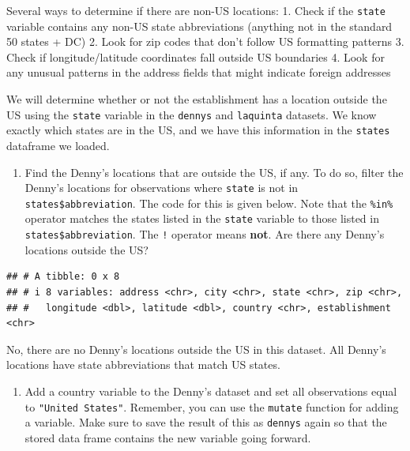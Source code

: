 \documentclass[
]{article}
\newenvironment{Shaded}{\begin{snugshade}}{\end{snugshade}}
\newcommand{\FunctionTok}[1]{\textcolor[rgb]{0.13,0.29,0.53}{\textbf{#1}}}
\newcommand{\NormalTok}[1]{#1}
\newcommand{\SpecialCharTok}[1]{\textcolor[rgb]{0.81,0.36,0.00}{\textbf{#1}}}
\providecommand{\tightlist}{%
  \setlength{\itemsep}{0pt}\setlength{\parskip}{0pt}}
\begin{document}
Several ways to determine if there are non-US locations: 1. Check if the
\texttt{state} variable contains any non-US state abbreviations
(anything not in the standard 50 states + DC) 2. Look for zip codes that
don't follow US formatting patterns 3. Check if longitude/latitude
coordinates fall outside US boundaries 4. Look for any unusual patterns
in the address fields that might indicate foreign addresses

We will determine whether or not the establishment has a location
outside the US using the \texttt{state} variable in the \texttt{dennys}
and \texttt{laquinta} datasets. We know exactly which states are in the
US, and we have this information in the \texttt{states} dataframe we
loaded.

\begin{enumerate}
\def\labelenumi{\arabic{enumi}.}
\setcounter{enumi}{4}
\tightlist
\item
  Find the Denny's locations that are outside the US, if any. To do so,
  filter the Denny's locations for observations where \texttt{state} is
  not in \texttt{states\$abbreviation}. The code for this is given
  below. Note that the \texttt{\%in\%} operator matches the states
  listed in the \texttt{state} variable to those listed in
  \texttt{states\$abbreviation}. The \texttt{!} operator means
  \textbf{not}. Are there any Denny's locations outside the US?
\end{enumerate}

\begin{Shaded}
\end{Shaded}

\begin{verbatim}
## # A tibble: 0 x 8
## # i 8 variables: address <chr>, city <chr>, state <chr>, zip <chr>,
## #   longitude <dbl>, latitude <dbl>, country <chr>, establishment <chr>
\end{verbatim}

No, there are no Denny's locations outside the US in this dataset. All
Denny's locations have state abbreviations that match US states.

\begin{enumerate}
\def\labelenumi{\arabic{enumi}.}
\setcounter{enumi}{5}
\tightlist
\item
  Add a country variable to the Denny's dataset and set all observations
  equal to \texttt{"United\ States"}. Remember, you can use the
  \texttt{mutate} function for adding a variable. Make sure to save the
  result of this as \texttt{dennys} again so that the stored data frame
  contains the new variable going forward.
\end{enumerate}
\end{document}
